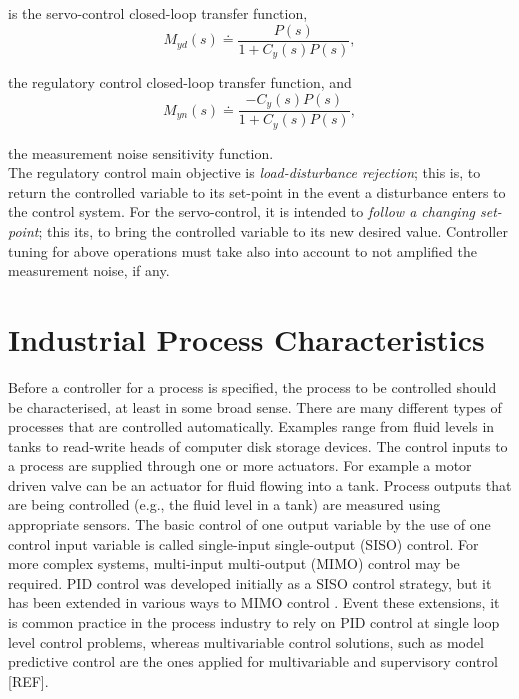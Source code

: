 \noindent is the servo-control closed-loop transfer function, 
\begin{equation}
	M_{yd}(s) \doteq \frac{P(s)}{1+C_y(s)P(s)}, \label{eq:myd}
\end{equation}

\noindent the regulatory control closed-loop transfer function, and
\begin{equation}
	M_{yn}(s) \doteq \frac{-C_y(s)P(s)}{1+C_y(s)P(s)}, \label{eq:myn}
\end{equation}

\noindent the measurement noise sensitivity function.\\

The regulatory control main objective is \emph{load-disturbance rejection}; this is, to return the controlled variable to its set-point in the event a disturbance enters to the control system.  For the servo-control, it is intended to \emph{follow a changing set-point}; this its, to bring the controlled variable to its new desired value. Controller tuning for above operations must take also into account to not amplified the measurement noise, if any.\\




\section{Industrial Process Characteristics}
\label{sec:2}

Before a controller for a process is specified, the process to be controlled should be characterised, at least in some broad sense. There are many different types of processes that are controlled automatically. Examples range from fluid levels in tanks to read-write heads of computer disk storage devices. The control inputs to a process are supplied through one or more actuators. For example a motor driven valve can be an actuator for fluid flowing into a tank. Process outputs that are being controlled (e.g., the fluid level in a tank) are measured using appropriate sensors. The basic control of one output variable by the use of one control input variable is called single-input single-output (SISO) control. For more complex systems, multi-input multi-output (MIMO) control may be required. PID control was developed initially as a SISO control strategy, but it has been extended in various ways to MIMO control \cite{wang2008}. Event these extensions, it is common practice in the process industry to rely on PID control at single loop level control problems, whereas multivariable control solutions, such as model predictive control are the ones applied for multivariable and supervisory control [REF].\\

